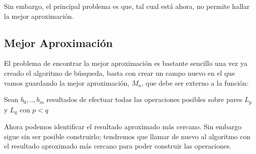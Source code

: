 Sin embargo, el principal problema es que, tal cual está ahora, no permite hallar
la mejor aproximación.

\subsection{Mejor Aproximación}
El problema de encontrar la mejor aproximación es bastante sencillo una vez
ya creado el algoritmo de búsqueda, basta con crear un campo nuevo en el que
vamos guardando la mejor aproximación, $M_a$, que debe ser externo a la función:
\vspace{0.25cm}

\begin{algo}
	\hspace{0.25cm}	Sean $b_0,..,b_m$ resultados de efectuar todas las operaciones posibles sobre pares $L_p$ y $L_q$ con $p < q$ \;
\end{algo}

Ahora podemos identificar el resultado aproximado más cercano. Sin embargo
sigue sin ser posible construirlo; tendremos que llamar de nuevo al algoritmo
con el resultado aproximado más cercano para poder construir las operaciones.
